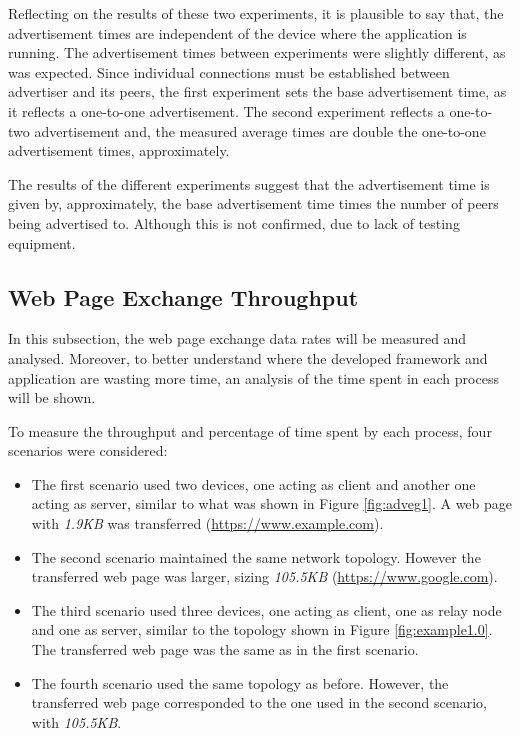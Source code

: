 Reflecting on the results of these two experiments, it is plausible to say that, the advertisement times are independent of the device where the application is running. The advertisement times between experiments were slightly different, as was expected. Since individual connections must be established between advertiser and its peers, the first experiment sets the base advertisement time, as it reflects a one-to-one advertisement. The second experiment reflects a one-to-two advertisement and, the measured average times are double the one-to-one advertisement times, approximately.

The results of the different experiments suggest that the advertisement time is given by, approximately, the base advertisement time times the number of peers being advertised to. Although this is not confirmed, due to lack of testing equipment.

\subsection{Web Page Exchange Throughput}

In this subsection, the web page exchange data rates will be measured and analysed. Moreover, to better understand where the developed framework and application are wasting more time, an analysis of the time spent in each process will be shown.

To measure the throughput and percentage of time spent by each process, four scenarios were considered: 

\begin{itemize}
	\item The first scenario used two devices, one acting as client and another one acting as server, similar to what was shown in Figure \ref{fig:adveg1}. A web page with \textit{1.9KB} was transferred (\url{https://www.example.com}).
	
	\item The second scenario maintained the same network topology. However the transferred web page was larger, sizing \textit{105.5KB} (\url{https://www.google.com}).
	
	\item The third scenario used three devices, one acting as client, one as relay node and one as server, similar to the topology shown in Figure \ref{fig:example1.0}. The transferred web page was the same as in the first scenario.
	
	\item The fourth scenario used the same topology as before. However, the transferred web page corresponded to the one used in the second scenario, with \textit{105.5KB}.
\end{itemize}

